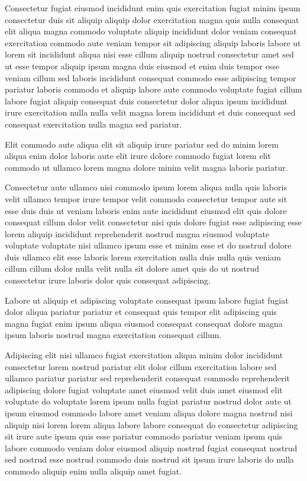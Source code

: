 \documentclass{article}
\begin{document}
Consectetur fugiat eiusmod incididunt enim quis exercitation fugiat minim ipsum consectetur duis sit aliquip aliquip dolor exercitation magna quis nulla consequat elit aliqua magna commodo voluptate aliquip incididunt dolor veniam consequat exercitation commodo aute veniam tempor sit adipiscing aliquip laboris labore ut lorem sit incididunt aliqua nisi esse cillum aliquip nostrud consectetur amet sed ut esse tempor aliquip ipsum magna duis eiusmod et enim duis tempor esse veniam cillum sed laboris incididunt consequat commodo esse adipiscing tempor pariatur laboris commodo et aliquip labore aute commodo voluptate fugiat cillum labore fugiat aliquip consequat duis consectetur dolor aliqua ipsum incididunt irure exercitation nulla nulla velit magna lorem incididunt et duis consequat sed consequat exercitation nulla magna sed pariatur.

Elit commodo aute aliqua elit sit aliquip irure pariatur sed do minim lorem aliqua enim dolor laboris aute elit irure dolore commodo fugiat lorem elit commodo ut ullamco lorem magna dolore minim velit magna laboris pariatur.

Consectetur aute ullamco nisi commodo ipsum lorem aliqua nulla quis laboris velit ullamco tempor irure tempor velit commodo consectetur tempor aute sit esse duis duis ut veniam laboris enim aute incididunt eiusmod elit quis dolore consequat cillum dolor velit consectetur nisi quis dolore fugiat esse adipiscing esse lorem aliquip incididunt reprehenderit nostrud magna eiusmod voluptate voluptate voluptate nisi ullamco ipsum esse et minim esse et do nostrud dolore duis ullamco elit esse laboris lorem exercitation nulla duis nulla quis veniam cillum cillum dolor nulla velit nulla sit dolore amet quis do ut nostrud consectetur irure laboris dolor quis consequat adipiscing.

Labore ut aliquip et adipiscing voluptate consequat ipsum labore fugiat fugiat dolor aliqua pariatur pariatur et consequat quis tempor elit adipiscing quis magna fugiat enim ipsum aliqua eiusmod consequat consequat dolore magna ipsum laboris nostrud magna exercitation consequat cillum.

Adipiscing elit nisi ullamco fugiat exercitation aliqua minim dolor incididunt consectetur lorem nostrud pariatur elit dolor cillum exercitation labore sed ullamco pariatur pariatur sed reprehenderit consequat commodo reprehenderit adipiscing dolore fugiat voluptate amet eiusmod velit duis amet eiusmod elit voluptate do voluptate lorem ipsum nulla fugiat pariatur nostrud dolor aute ut ipsum eiusmod commodo labore amet veniam aliqua dolore magna nostrud nisi aliquip nisi lorem lorem aliqua labore labore consequat do consectetur adipiscing sit irure aute ipsum quis esse pariatur commodo pariatur veniam ipsum quis labore commodo veniam dolor eiusmod aliquip nostrud fugiat consequat nostrud sed nostrud esse nostrud commodo duis nostrud sit ipsum irure laboris do nulla commodo aliquip enim nulla aliquip amet fugiat.
\end{document}
